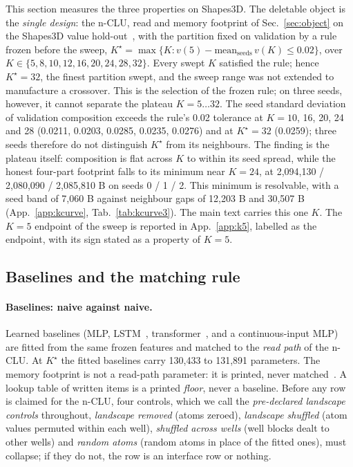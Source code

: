 \documentclass{article} %
\newcommand{\Kstar}{\ensuremath{K^{\star}}}
\begin{document}
This section measures the three properties on Shapes3D. The deletable object is the \emph{single design}: the n-CLU, read and memory footprint of
Sec.~\ref{sec:object} on the Shapes3D value hold-out~\citep{montero2021role,schott_visual_2022}, with the partition fixed on validation
by a rule frozen before the sweep, $\Kstar=\max\{K : v(5)-\text{mean}_{\text{seeds}}\,v(K)\le
0.02\}$, over $K\in\{5,8,10,12,16,20,24,28,32\}$. Every swept $K$ satisfied the rule; hence
$\Kstar=32$, the finest partition swept, and the sweep range was not extended to manufacture a
crossover. %
This is the selection of the frozen rule; on three seeds, however, it cannot separate the plateau
$K=5\ldots32$. The seed standard deviation of validation composition exceeds the rule's 0.02
tolerance at $K=10$, 16, 20, 24 and 28 (0.0211, 0.0203, 0.0285, 0.0235, 0.0276) and at $\Kstar=32$ %
(0.0259); three seeds therefore do not distinguish $\Kstar$ from its neighbours. %
The finding is the plateau itself: composition is flat across $K$ to within its seed spread,
while the honest four-part footprint falls to its minimum near $K=24$, at 2,094,130 / 2,080,090 / 2,085,810 B %
on seeds 0 / 1 / 2. This minimum is resolvable, with a seed band of 7,060 B against neighbour gaps of %
12,203 B and 30,507 B (App.~\ref{app:kcurve}, Tab.~\ref{tab:kcurve3}). %
The main text carries this one $K$. The $K=5$ endpoint of the sweep is reported in
App.~\ref{app:k5}, labelled as the endpoint, with its sign stated as a property of $K=5$.

\subsection{Baselines and the matching rule}

\paragraph{Baselines: naive against naive.} Learned baselines (MLP, LSTM~\citep{hochreiter_long_1997}, transformer~\citep{vaswani_attention_2023}, and a
continuous-input MLP) are fitted from the same frozen features and matched to the
\emph{read path} of the n-CLU. At $\Kstar$ the fitted baselines carry 130,433 to 131,891 parameters.
The memory footprint is not a read-path parameter: it is printed, never matched~\citep{borgeaud_improving_2022,khandelwal_generalization_2020,lample_large_2019}. A lookup table
of written items is a printed \emph{floor}, never a baseline. Before any row is claimed for the
n-CLU, four controls, which we call the \emph{pre-declared landscape controls} throughout, \emph{landscape removed} (atoms zeroed), \emph{landscape shuffled} (atom values permuted within each well), \emph{shuffled across wells}
(well blocks dealt to other wells) and \emph{random atoms} (random atoms in place of the fitted ones), must collapse; if they do
not, the row is an interface row or nothing.
\end{document}

